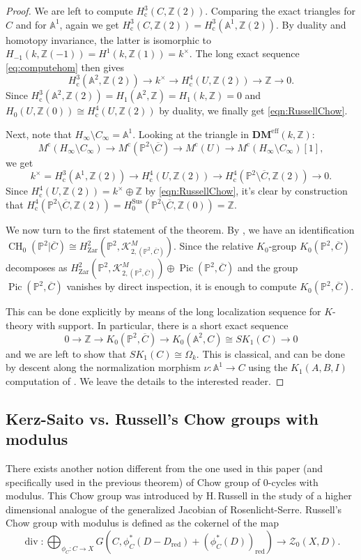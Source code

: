 \documentclass[JEP,XML,SOM,Unicode,published]{cedram}
\let\mathcal\mathscr
\newcommand{\rc}{\mathrm{c}}
\newcommand{\sus}{\mathrm{Sus}}
\theoremstyle{definition}
\newcommand{\sZ}{{\mathcal Z}}
\newcommand{\A}{{\mathbb A}}
\renewcommand{\P}{{\mathbb P}}
\newcommand{\Z}{{\mathbb Z}}
\DeclareMathOperator{\CH}{CH}
\DeclareMathOperator{\divf}{div}
\DeclareMathOperator{\Pic}{Pic}
\newcommand{\eff}{\mathrm{eff}}
\newcommand{\red}{\mathrm{red}}
\newcommand{\zar}{\mathrm{Zar}}
\let\ov\overline
\let\ol\ov
\begin{document}
\begin{proof}
We are left to compute $H_{\rc}^{3}(C, \Z(2))$. Comparing the exact triangles for $C$ and for $\A^1$, again we get $H_{\rc}^{3}(C, \Z(2)) = H_{\rc}^{3}(\A^1, \Z(2))$. By duality and homotopy invariance, the latter is isomorphic to $H_{-1}(k, \Z(-1)) = H^1(k, \Z(1)) = k^\times$. The long exact sequence \eqref{eq:computehom} then gives
\[ H_{\rc}^{3}(\A^2, \Z(2)) \to k^\times \to H_{\rc}^4(U, \Z(2)) \to \Z \to 0.\]
Since $H_{\rc}^{3}(\A^2, \Z(2)) = H_1(\A^2, \Z) = H_1(k, \Z) = 0$ and
$H_0(U, \Z(0)) \cong H_{\rc}^4(U, \Z(2))$ by duality, we finally get \eqref{eqn:RussellChow}.

Next, note that $H_\infty\setminus C_\infty = \A^1$. Looking at the triangle in
${\mathbf{DM}}^{\eff}(k, \Z)$:
\[ M^\rc(H_\infty\setminus C_\infty) \to M^\rc(\P^2\setminus \ol{C}) \to M^\rc(U) \to M^\rc(H_\infty\setminus C_\infty)[1],\]
we get
\[k^\times = H_{\rc}^{3}(\A^1, \Z(2)) \to H_{\rc}^4(U, \Z(2)) \to H_{\rc}^4(\P^2\setminus \ol{C}, \Z(2)) \to 0.\]
Since $H_{\rc}^4(U, \Z(2)) = k^\times\oplus \Z$ by \eqref{eqn:RussellChow}, it's clear by construction that $H_{\rc}^4(\P^2\setminus \ol{C}, \Z(2)) = H_0^{\sus}(\P^2 \setminus \ol{C}, \Z(0))=\Z$.

We now turn to the first statement of the theorem. By \cite[Th.\,1.1]{BKS},
we have an identification $\CH_0(\P^2|\ol{C}) \cong
H^2_{\zar}(\P^2, \mathcal{K}^M_{2, (\P^2, \ol{C})})$.
Since the relative $K_0$-group $K_0(\P^2, \ol{C})$ decomposes as
$H^2_{\zar}(\P^2, \mathcal{K}^M_{2, (\P^2, \ol{C})}) \oplus \Pic(\P^2, \ol{C})$ and the
group $\Pic(\P^2, \ol{C})$ vanishes by direct inspection, it is enough to compute
$K_0(\P^2, \ol{C})$.

This can be done explicitly by means of the long localization sequence for $K$-theory
with support. In particular, there is a short exact sequence
\[0\to \Z \to K_0(\P^2, \ol{C}) \to K_0(\A^2, C) \cong SK_1(C)\to 0\]
and we are left to show that $SK_1(C) \cong \Omega_{k}$. This is classical, and
can be done by descent along the normalization morphism $\nu\colon \A^1\to C$ using
the $K_1(A,B,I)$ computation of \cite{GW}. We leave the details to the interested
reader.
\end{proof}

\subsection{Kerz-Saito vs. Russell's Chow groups with modulus}
\label{sec:Russell}
There exists another notion different from the one used in this paper (and specifically used in the previous theorem) of Chow group of $0$-cycles with
modulus. This Chow group was introduced by H.\,Russell \cite{RussellANT} in the study of a higher dimensional analogue of the generalized Jacobian of Rosenlicht-Serre. Russell's Chow group with modulus is defined as the cokernel of the map
\[\divf\colon \bigoplus_{\phi_C\colon C\to X}G(C, \phi_C^*(D-D_{\red}) + (\phi_C^*(D))_{\red})\to \sZ_0(X,D).\]
\end{document}

